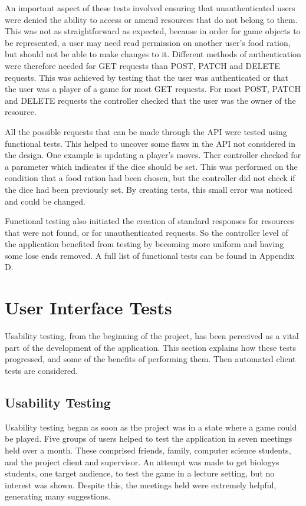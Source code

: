 An important aspect of these tests involved ensuring that unauthenticated users were denied the ability to access or amend resources that do not belong to them. This was not as straightforward as expected, because in order for game objects to be represented, a user may need read permission on another user's food ration, but should not be able to make changes to it. Different methods of authentication were therefore needed for GET requests than POST, PATCH and DELETE requests. This was achieved by testing that the user was authenticated or that the user was a player of a game for most GET requests. For most POST, PATCH and DELETE requests the controller checked that the user was the owner of the resource.

All the possible requests that can be made through the API were tested using functional tests. This helped to uncover some flaws in the API not considered in the design. One example is updating a player's moves. Ther controller checked for a parameter which indicates if the dice should be set. This was performed on the condition that a food ration had been chosen, but the controller did not check if the dice had been previously set. By creating tests, this small error was noticed and could be changed.

Functional testing also initiated the creation of standard responses for resources that were not found, or for unauthenticated requests. So the controller level of the application benefited from testing by becoming more uniform and having some lose ends removed. A full list of functional tests can be found in Appendix D.

\section{User Interface Tests}
Usability testing, from the beginning of the project, has been perceived as a vital part of the development of the application. This section explains how these tests progressed, and some of the benefits of performing them. Then automated client tests are considered.

\subsection{Usability Testing}
Usability testing began as soon as the project was in a state where a game could be played. Five groups of users helped to test the application in seven meetings held over a month. These comprised friends, family, computer science students, and the project client and supervisor. An attempt was made to get biologys students, one target audience, to test the game in a lecture setting, but no interest was shown. Despite this, the meetings held were extremely helpful, generating many suggestions.

